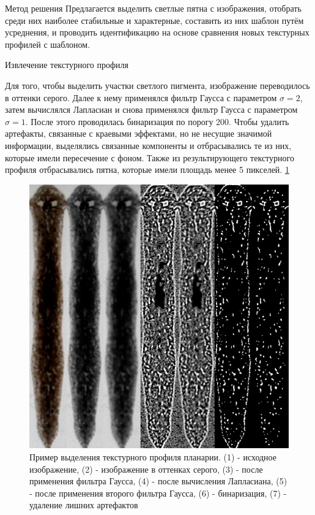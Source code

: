 \documentclass{article}
\begin{document}
\begin{section}{Метод решения}
Предлагается выделить светлые пятна с изображения, отобрать среди них наиболее стабильные и характерные, составить из них шаблон путём усреднения, и проводить идентификацию на основе сравнения новых текстурных профилей с шаблоном.

\begin{subsection}{Извлечение текстурного профиля}

    Для того, чтобы выделить участки светлого пигмента, изображение переводилось в оттенки серого. Далее к нему применялся фильтр Гаусса с параметром $\sigma = 2$, затем вычислялся Лапласиан и снова применялся фильтр Гаусса с параметром $\sigma=1$. После этого проводилась бинаризация по порогу 200. Чтобы удалить артефакты, связанные с краевыми эффектами, но не несущие значимой информации, выделялись связанные компоненты и отбрасывались те из них, которые имели пересечение с фоном.
    Также из результирующего текстурного профиля отбрасывались пятна, которые имели площадь менее 5 пикселей.
    \ref{fig3}

\begin{figure}[H]
\centering
\includegraphics[scale=0.3]{spots_extraction.png}
\centering
\caption{Пример выделения текстурного профиля планарии. (1) - исходное изображение, (2) - изображение в оттенках серого, (3) - после применения фильтра Гаусса, (4) - после вычисления Лапласиана, (5) - после применения второго фильтра Гаусса, (6) - бинаризация, (7) - удаление лишних артефактов}
\label{fig3}
\end{figure}
    

\end{subsection}
\end{section}
\end{document}
